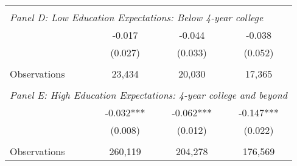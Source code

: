 {\begin{tabular}{lccc}
&  &  &   \\
\multicolumn{4}{l}{\textit{Panel D: Low Education Expectations: Below 4-year college}} \\
\hspace{3mm}        &      -0.017   &      -0.044   &      -0.038   \\
                    &     (0.027)   &     (0.033)   &     (0.052)   \\
                    &               &               &               \\
\hspace{3mm}Observations&      23,434   &      20,030   &      17,365   \\
 
&  &  &   \\
\multicolumn{4}{l}{\textit{Panel E: High Education Expectations: 4-year college and beyond}} \\
\hspace{3mm}        &      -0.032***&      -0.062***&      -0.147***\\
                    &     (0.008)   &     (0.012)   &     (0.022)   \\
                    &               &               &               \\
\hspace{3mm}Observations&     260,119   &     204,278   &     176,569   \\
 

\bottomrule
\end{tabular}
}
